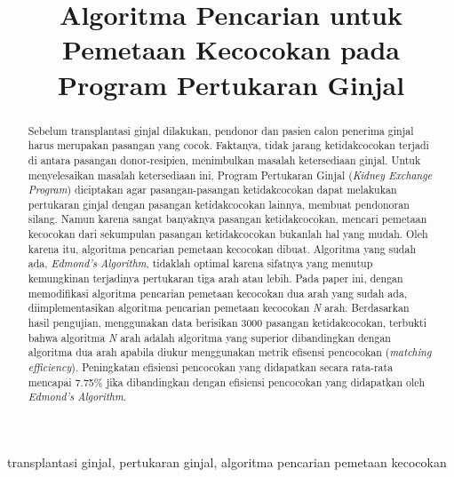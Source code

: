 \documentclass[conference]{IEEEtran}
\begin{document}
\title{Algoritma Pencarian untuk Pemetaan Kecocokan pada Program Pertukaran Ginjal}

\author{
\and
{}
\and
{}
}

\maketitle

\begin{abstract}
Sebelum transplantasi ginjal dilakukan, pendonor dan pasien calon penerima ginjal harus merupakan pasangan yang cocok.
Faktanya, tidak jarang ketidakcocokan terjadi di antara pasangan donor-resipien, menimbulkan masalah ketersediaan ginjal.
Untuk menyelesaikan masalah ketersediaan ini, Program Pertukaran Ginjal (\textit{Kidney Exchange Program}) diciptakan agar
pasangan-pasangan ketidakcocokan dapat melakukan pertukaran ginjal dengan pasangan ketidakcocokan lainnya, membuat pendonoran
silang. Namun karena sangat banyaknya pasangan ketidakcocokan, mencari pemetaan kecocokan dari sekumpulan pasangan ketidakcocokan
bukanlah hal yang mudah. Oleh karena itu, algoritma pencarian pemetaan kecocokan dibuat. Algoritma yang sudah ada, \textit{Edmond's Algorithm},
tidaklah optimal karena sifatnya yang menutup kemungkinan terjadinya pertukaran tiga arah atau lebih. Pada paper ini,
dengan memodifikasi algoritma pencarian pemetaan kecocokan dua arah yang sudah ada, diimplementasikan algoritma pencarian
pemetaan kecocokan \textit{N} arah. Berdasarkan hasil pengujian, menggunakan data berisikan 3000 pasangan ketidakcocokan,
terbukti bahwa algoritma \textit{N} arah adalah algoritma yang superior dibandingkan dengan algoritma dua arah apabila diukur
menggunakan metrik efisensi pencocokan (\textit{matching efficiency}). Peningkatan efisiensi pencocokan yang didapatkan secara
rata-rata mencapai 7.75\% jika dibandingkan dengan efisiensi pencocokan yang didapatkan oleh \textit{Edmond's Algorithm}.
\end{abstract}

\begin{IEEEkeywords}
transplantasi ginjal, pertukaran ginjal, algoritma pencarian pemetaan kecocokan
\end{IEEEkeywords}
\end{document}
